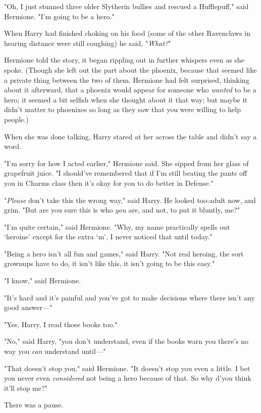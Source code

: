 "Oh, I just stunned three older Slytherin bullies and rescued a Hufflepuff," 
said Hermione. "I'm going to be a hero."

When Harry had finished choking on his food (some of the other Ravenclaws in 
hearing distance were still coughing) he said, "\emph{What?}"

Hermione told the story, it began rippling out in further whispers even as she 
spoke. (Though she left out the part about the phoenix, because that seemed 
like a private thing between the two of them. Hermione had felt surprised, 
thinking about it afterward, that a phoenix would appear for someone who 
\emph{wanted} to be a hero; it seemed a bit selfish when she thought about it 
that way; but maybe it didn't matter to phoenixes so long as they saw that you 
were willing to help people.)

When she was done talking, Harry stared at her across the table and didn't say 
a word.

"I'm sorry for how I acted earlier," Hermione said. She sipped from her glass 
of grapefruit juice. "I should've remembered that if I'm still beating the 
pants off you in Charms class then it's okay for you to do better in Defense."

"\emph{Please} don't take this the wrong way," said Harry. He looked too-adult 
now, and grim. "But are you sure this is who \emph{you} are, and not, to put it 
bluntly, me?"

"I'm quite certain," said Hermione. "Why, my name practically spells out 
`heroine' except for the extra `m', I never noticed that until today."

"Being a hero isn't all fun and games," said Harry. "Not real heroing, the sort 
grownups have to do, it isn't like this, it isn't going to be this easy."

"I know," said Hermione.

"It's hard and it's painful and you've got to make decisions where there isn't 
any good answer---"

"Yes, Harry, I read those books too."

"No," said Harry, "you don't understand, even if the books warn you there's no 
way you \emph{can} understand until---"

"That doesn't stop you," said Hermione. "It doesn't stop you even a little. I 
bet you never even \emph{considered} not being a hero because of that. So why 
d'you think it'll stop me?"

There was a pause.

